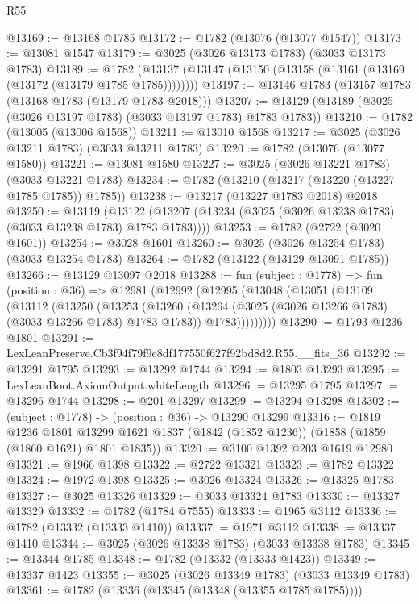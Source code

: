 \begin{lexlean}{R55}
\begin{coremodule}
@13169 := @13168 @1785
@13172 := @1782 (@13076 (@13077 @1547))
@13173 := @13081 @1547
@13179 := @3025 (@3026 @13173 @1783) (@3033 @13173 @1783)
@13189 := @1782 (@13137 (@13147 (@13150 (@13158 (@13161 (@13169 (@13172 (@13179 @1785 @1785))))))))
@13197 := @13146 @1783 (@13157 @1783 (@13168 @1783 (@13179 @1783 @2018)))
@13207 := @13129 (@13189 (@3025 (@3026 @13197 @1783) (@3033 @13197 @1783) @1783 @1783))
@13210 := @1782 (@13005 (@13006 @1568))
@13211 := @13010 @1568
@13217 := @3025 (@3026 @13211 @1783) (@3033 @13211 @1783)
@13220 := @1782 (@13076 (@13077 @1580))
@13221 := @13081 @1580
@13227 := @3025 (@3026 @13221 @1783) (@3033 @13221 @1783)
@13234 := @1782 (@13210 (@13217 (@13220 (@13227 @1785 @1785)) @1785))
@13238 := @13217 (@13227 @1783 @2018) @2018
@13250 := @13119
    (@13122 (@13207 (@13234 (@3025 (@3026 @13238 @1783) (@3033 @13238 @1783) @1783 @1783))))
@13253 := @1782 (@2722 (@3020 @1601))
@13254 := @3028 @1601
@13260 := @3025 (@3026 @13254 @1783) (@3033 @13254 @1783)
@13264 := @1782 (@13122 (@13129 @13091 @1785))
@13266 := @13129 @13097 @2018
@13288 := fun (subject : @1778) =>
  fun (position : @36) =>
  @12981
    (@12992
      (@12995
        (@13048
          (@13051
            (@13109
              (@13112
                (@13250
                  (@13253
                    (@13260
                      (@13264 (@3025 (@3026 @13266 @1783) (@3033 @13266 @1783) @1783 @1783))
                      @1783)))))))))
@13290 := @1793 @1236 @1801
@13291 := LexLeanPreserve.Cb3f94f79f9e8df177550f627f92bd8d2.R55.__fits_36
@13292 := @13291 @1795
@13293 := @13292 @1744
@13294 := @1803 @13293
@13295 := LexLeanBoot.AxiomOutput.whiteLength
@13296 := @13295 @1795
@13297 := @13296 @1744
@13298 := @201 @13297
@13299 := @13294 @13298
@13302 := (subject : @1778) -> (position : @36) -> @13290 @13299
@13316 := @1819
    @1236
    @1801
    @13299
    @1621
    @1837
    (@1842 (@1852 @1236))
    (@1858 (@1859 (@1860 @1621) @1801 @1835))
@13320 := @3100 @1392 @203 @1619 @12980
@13321 := @1966 @1398
@13322 := @2722 @13321
@13323 := @1782 @13322
@13324 := @1972 @1398
@13325 := @3026 @13324
@13326 := @13325 @1783
@13327 := @3025 @13326
@13329 := @3033 @13324 @1783
@13330 := @13327 @13329
@13332 := @1782 (@1784 @7555)
@13333 := @1965 @3112
@13336 := @1782 (@13332 (@13333 @1410))
@13337 := @1971 @3112
@13338 := @13337 @1410
@13344 := @3025 (@3026 @13338 @1783) (@3033 @13338 @1783)
@13345 := @13344 @1785
@13348 := @1782 (@13332 (@13333 @1423))
@13349 := @13337 @1423
@13355 := @3025 (@3026 @13349 @1783) (@3033 @13349 @1783)
@13361 := @1782 (@13336 (@13345 (@13348 (@13355 @1785 @1785))))

\end{coremodule}
\end{lexlean}
